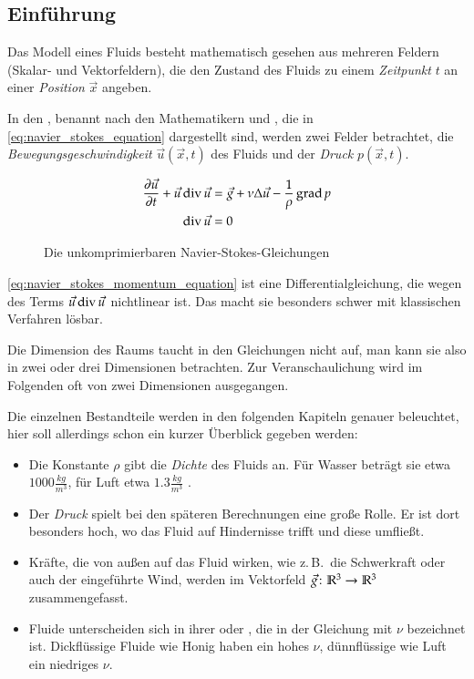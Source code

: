 \subsection{Einführung}

Das Modell eines Fluids besteht mathematisch gesehen aus mehreren Feldern
(Skalar- und Vektorfeldern), die den Zustand des Fluids zu einem
\emph{Zeitpunkt} $t$ an einer \emph{Position} $\vec{x}$ angeben.

In den , benannt nach den
Mathematikern  und
, die in
\autoref{eq:navier_stokes_equation} dargestellt sind, werden
zwei Felder betrachtet, die \emph{Bewegungsgeschwindigkeit}
$\vec{u}(\vec{x},t)$ des Fluids und der \emph{Druck} $p(\vec{x},t)$.

\begin{figure}
\begin{align}
\label{eq:navier_stokes_momentum_equation}
\frac{
	\partial
	\vec{u}
}
{
	\partial t
} +
\vec{u} \operatorname*{div} \vec{u}
& =
\vec{g} +
\nu \Delta \vec{u} -
\frac{
	1
}
{
	\rho
}
\operatorname*{grad} p
\\
\label{eq:navier_stokes_incompressibility_condition}
\operatorname*{div} \vec{u} & = 0
\end{align}
\caption{Die unkomprimierbaren Navier-Stokes-Gleichungen}
\label{eq:navier_stokes_equation}
\end{figure}

\autoref{eq:navier_stokes_momentum_equation} ist eine Differentialgleichung, die
wegen des Terms $\vec{u} \operatorname*{div} \vec{u}$ nichtlinear ist. Das macht sie
besonders schwer mit klassischen Verfahren lösbar.

Die Dimension des Raums taucht in den Gleichungen nicht auf, man kann sie also
in zwei oder drei Dimensionen betrachten. Zur Veranschaulichung wird im
Folgenden oft von zwei Dimensionen ausgegangen.

Die einzelnen Bestandteile werden in den folgenden Kapiteln genauer beleuchtet,
hier soll allerdings schon ein kurzer Überblick gegeben werden:

\begin{itemize}
\item
	Die Konstante $\rho$ gibt die \emph{Dichte} des Fluids an. Für Wasser beträgt
	sie etwa $1000 \frac{kg}{m^3}$, für Luft etwa $1.3
        \frac{kg}{m^3}$ \cite{Bridson2007}.
\item
	Der \emph{Druck} spielt bei den späteren Berechnungen eine große Rolle.
	Er ist dort besonders hoch, wo das Fluid auf Hindernisse
        trifft und diese umfließt.
\item
	Kräfte, die von außen auf das Fluid wirken, wie z.\,B.\ die Schwerkraft
	oder auch der eingeführte Wind, werden im Vektorfeld $\vec{g} \colon
	\mathbb{R}^3 \to \mathbb{R}^3$ zusammengefasst.
\item
	Fluide unterscheiden sich in ihrer 
	oder , die in der Gleichung mit $\nu$
	bezeichnet ist. Dickflüssige Fluide wie Honig haben ein hohes $\nu$,
	dünnflüssige wie Luft ein niedriges $\nu$.
\end{itemize}


